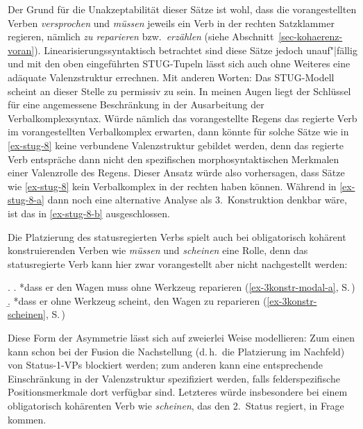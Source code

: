 Der Grund für die Unakzeptabilität dieser Sätze ist wohl, dass die vorangestellten Verben {\it versprochen} und {\it müssen} jeweils ein Verb in der rechten Satzklammer regieren, nämlich {\it zu reparieren} bzw.\ {\it erzählen} (siehe Abschnitt~\ref{sec-kohaerenz-voran}). Linearisierungssyntaktisch betrachtet sind diese Sätze jedoch unauf"|fällig und mit den oben eingeführten STUG-Tupeln lässt sich auch ohne Weiteres eine adäquate Valenzstruktur errechnen. Mit anderen Worten: Das STUG-Modell scheint an dieser Stelle zu permissiv zu sein. In meinen Augen liegt der Schlüssel für eine angemessene Beschränkung in der Ausarbeitung der Verbalkomplexsyntax. Würde nämlich das vorangestellte Regens das regierte Verb im vorangestellten Verbalkomplex erwarten, dann könnte für solche Sätze wie in \ref{ex-stug-8} keine verbundene Valenzstruktur gebildet werden, denn das regierte Verb entspräche dann nicht den spezifischen morphosyntaktischen Merkmalen einer Valenzrolle des Regens. Dieser Ansatz würde also vorhersagen, dass Sätze wie \ref{ex-stug-8} kein Verbalkomplex in der rechten  haben können. Während in \ref{ex-stug-8-a} dann noch eine alternative Analyse als 3.~Konstruktion denkbar wäre, ist das in \ref{ex-stug-8-b} ausgeschlossen. 

Die Platzierung des statusregierten Verbs spielt auch bei obligatorisch kohärent konstruierenden Verben wie {\it müssen} und {\it scheinen} eine Rolle, denn das statusregierte Verb kann hier zwar vorangestellt aber nicht nachgestellt werden:

\ex.
\a. *dass er den Wagen muss ohne Werkzeug reparieren \hfill (\ref{ex-3konstr-modal-a}, S.\,\pageref{ex-3konstr-modal-a})
\b. *dass er ohne Werkzeug scheint, den Wagen zu reparieren \hfill (\ref{ex-3konstr-scheinen}, S.\,\pageref{ex-3konstr-scheinen})

Diese Form der Asymmetrie lässt sich auf zweierlei Weise modellieren: Zum einen kann schon bei der Fusion die Nachstellung (d.\,h.\ die Platzierung im Nachfeld) von Status-1-VPs blockiert werden; zum anderen kann eine entsprechende Einschränkung in der Valenzstruktur spezifiziert werden, falls felderspezifische Positionsmerkmale dort verfügbar sind. Letzteres würde insbesondere bei einem obligatorisch kohärenten Verb wie {\it scheinen}, das den 2.~Status regiert, in Frage kommen.

\clearpage


